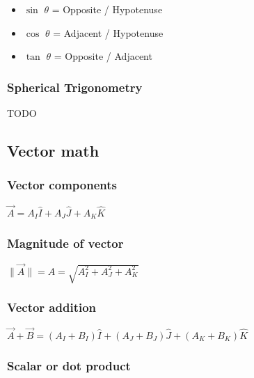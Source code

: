 \documentclass{article}
\begin{document}
\begin{itemize}
	\item $\sin$ $\theta$ = Opposite / Hypotenuse
	\item $\cos$ $\theta$ = Adjacent / Hypotenuse
	\item $\tan$ $\theta$ = Opposite / Adjacent
\end{itemize}

\subsubsection*{Spherical Trigonometry}
TODO

\subsection{Vector math}
\subsubsection*{Vector components}
$\vec{A} = A_I\hat{I} + A_J\hat{J} + A_K\hat{K}$

\subsubsection*{Magnitude of vector}
$\lVert\vec{A}\rVert = A = \sqrt{A_I^2 + A_J^2 + A_K^2}$

\subsubsection*{Vector addition}
$\vec{A} + \vec{B} = (A_I + B_I)\hat{I} + (A_J + B_J)\hat{J} + (A_K + B_K)\hat{K}$

\subsubsection*{Scalar or dot product}
\end{document}
